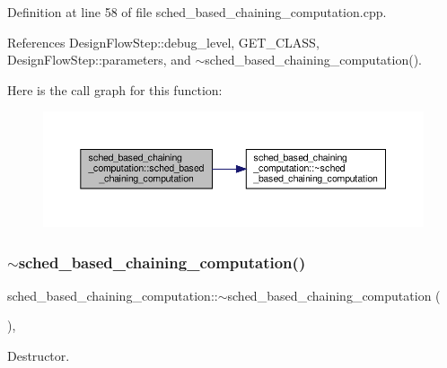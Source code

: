 Definition at line 58 of file sched\+\_\+based\+\_\+chaining\+\_\+computation.\+cpp.



References Design\+Flow\+Step\+::debug\+\_\+level, G\+E\+T\+\_\+\+C\+L\+A\+SS, Design\+Flow\+Step\+::parameters, and $\sim$sched\+\_\+based\+\_\+chaining\+\_\+computation().

Here is the call graph for this function\+:
\nopagebreak
\begin{figure}[H]
\begin{center}
\leavevmode
\includegraphics[width=350pt]{d7/d8d/classsched__based__chaining__computation_a3cd8266c4d472fd3de6f7e147656a911_cgraph}
\end{center}
\end{figure}
\mbox{\label{classsched__based__chaining__computation_af282ab6da358a273c46617a1070faa5e}} 
\subsubsection{\texorpdfstring{$\sim$sched\+\_\+based\+\_\+chaining\+\_\+computation()}{~sched\_based\_chaining\_computation()}}
{\footnotesize\ttfamily sched\+\_\+based\+\_\+chaining\+\_\+computation\+::$\sim$sched\+\_\+based\+\_\+chaining\+\_\+computation (\begin{DoxyParamCaption}{ }\end{DoxyParamCaption})\hspace{0.3cm}{\ttfamily [override]}, {\ttfamily [default]}}



Destructor. 




